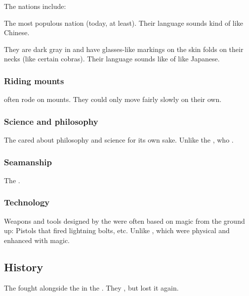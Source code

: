 The nations include:
\begin{gloss}
  \gitem{\KyanHweDin} 
  The most populous nation (today, at least). 
  Their language sounds kind of like Chinese. 
  
  \gitem{\Okiriru:}
  They are dark gray in \colour and have glasses-like markings on the skin folds on their necks (like certain cobras). 
  Their language sounds like of like Japanese. 
\end{gloss}





\subsubsection{Riding mounts}
\QuilJaaran often rode on mounts. 
They could only move fairly slowly on their own. 





\subsubsection{Science and philosophy}
The \quiljaaran{} cared about philosophy and science for its own sake. 
Unlike the \aryothim, who . 





\subsubsection{Seamanship}
The \quiljaaran{} . 





\subsubsection{Technology}
Weapons and tools designed by the \quiljaaran{} were often based on magic from the ground up: 
Pistols that fired lightning bolts, etc. 
Unlike , which were physical and enhanced with magic. 










\subsection{History}
The \quiljaaran{} fought alongside the \dragons{} in the \firstbanewar. 
They , but lost it again. 









